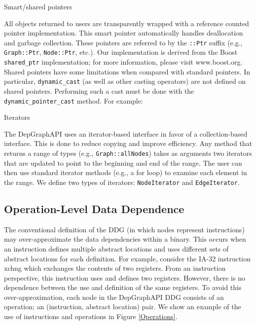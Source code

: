 \documentclass[12pt,titlepage]{article}
\begin{document}
\noindent Smart/shared pointers

All objects returned to users are transparently wrapped with a
reference counted pointer implementation. This smart pointer
automatically handles deallocation and garbage collection. These
pointers are referred to by the \texttt{::Ptr} suffix (e.g., \texttt{Graph::Ptr},
\texttt{Node::Ptr}, etc.). Our implementation is derived from the Boost
\texttt{shared\_ptr} implementation; for more information, please visit
www.boost.org. Shared pointers have some limitations when compared
with standard pointers. In particular, \texttt{dynamic\_cast} (as well as other
casting operators) are not defined on shared pointers. Performing such
a cast must be done with the \texttt{dynamic\_pointer\_cast} method. For example:

\normalfont\normalsize

\noindent Iterators 

The DepGraphAPI uses an iterator-based interface in favor of a
collection-based interface. This is done to reduce copying and improve
efficiency. Any method that returns a range of types (e.g.,
\texttt{Graph::allNodes}) takes as arguments two iterators that are updated to
point to the beginning and end of the range. The user can then use
standard iterator methods (e.g., a for loop) to examine each element
in the range. We define two types of iterators: \texttt{NodeIterator} and
\texttt{EdgeIterator}.

\subsection{Operation-Level Data Dependence}

The conventional definition of the DDG (in which nodes represent
instructions) may over-approximate the data dependencies within a
binary. This occurs when an instruction defines multiple abstract
locations and uses different sets of abstract locations for each
definition. For example, consider the IA-32 instruction xchng which
exchanges the contents of two registers. From an instruction
perspective, this instruction uses and defines two registers. However,
there is no dependence between the use and definition of the same
registers. To avoid this over-approximation, each node in the
DepGraphAPI DDG consists of an operation; an (instruction, abstract
location) pair. We show an example of the use of instructions and
operations in Figure \ref{Operations}.
\end{document}
